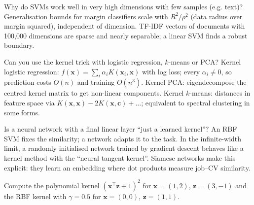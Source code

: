 \begin{qa}{\deep Why do SVMs work well in very high dimensions with few samples (e.g. text)?}
\why Generalisation bounds for margin classifiers scale with $R^2/\rho^2$ (data radius over margin squared), independent of dimension.
TF-IDF vectors of documents with 100{,}000 dimensions are sparse and nearly separable; a linear SVM finds a robust boundary.
\end{qa}

\begin{qa}{\deep Can you use the kernel trick with logistic regression, $k$-means or PCA?}
\why Kernel logistic regression: $f(\mathbf x) = \sum_i\alpha_iK(\mathbf x_i,\mathbf x)$ with log loss; every $\alpha_i\ne0$, so prediction costs
$O(n)$ and training $O(n^3)$. Kernel PCA: eigendecompose the centred kernel matrix to get non-linear components. Kernel $k$-means: distances
in feature space via $K(\mathbf x,\mathbf x) - 2K(\mathbf x,\mathbf c) + \dots$; equivalent to spectral clustering in some forms.
\end{qa}

\begin{qa}{\deep Is a neural network with a final linear layer ``just a learned kernel''?}
\why An RBF SVM fixes the similarity; a network adapts it to the task. In the infinite-width limit, a randomly initialised network
trained by gradient descent behaves like a kernel method with the ``neural tangent kernel''. Siamese networks make this explicit: they
learn an embedding where dot products measure job--CV similarity.
\end{qa}

\begin{qa}{Compute the polynomial kernel $(\mathbf x^\top\mathbf z + 1)^2$ for $\mathbf x = (1,2)$, $\mathbf z = (3,-1)$ and the RBF kernel with
$\gamma = 0.5$ for $\mathbf x = (0,0)$, $\mathbf z = (1,1)$.}
\end{qa}

